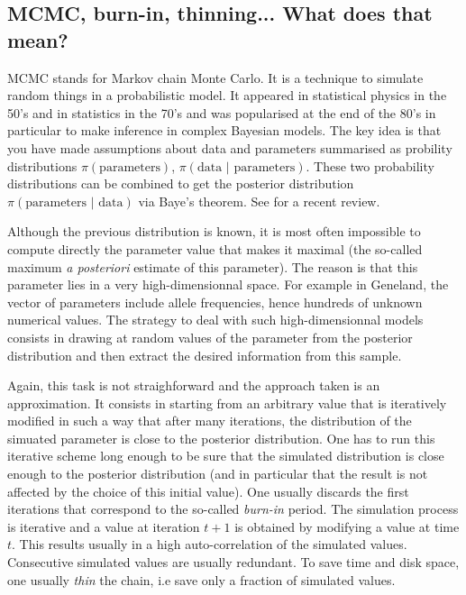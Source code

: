 \documentclass[a4paper,10pt]{article}
\begin{document}
\subsection[MCMC jargon]{MCMC, burn-in, thinning... What does that mean?}

MCMC stands for Markov chain Monte Carlo. It is a technique to simulate random things in a probabilistic model. 
It appeared in statistical physics 
in the 50's and in statistics in the 70's and was popularised at the end of the 80's in particular to make 
inference in complex Bayesian models. 
The key idea is that you have made assumptions about data and parameters summarised as probility distributions 
$\pi(\mbox{parameters})$,  $\pi(\mbox{data $|$ parameters})$. 
These two probability distributions can be combined to get the posterior distribution 
$\pi(\mbox{parameters $|$ data})$ via Baye's theorem. See \cite{Beaumont04} for a recent review. 


Although the previous distribution is known, it is most often impossible to compute directly the parameter value that 
makes it maximal (the so-called maximum {\em a posteriori} estimate of this parameter). The reason is that this parameter lies in a very high-dimensionnal 
space. For example in {\sc Geneland}, the vector of parameters  include allele frequencies, hence hundreds of unknown numerical values. 
The strategy to deal with such high-dimensionnal models consists in drawing at random values of the parameter from the posterior distribution 
and then extract the desired information from this sample. 

Again, this task is  not straighforward and the approach taken is an approximation. 
It consists in starting from an arbitrary value that is iteratively modified in such a way that after many iterations, 
the distribution of the 
simuated parameter is close to the posterior  distribution.  
One has to run this iterative scheme long enough to be sure that the simulated distribution is 
close enough to the posterior distribution (and in particular that the result is not  
affected by the choice of this initial value).
One usually discards the first iterations that correspond to the so-called {\em burn-in} period. 
The simulation process is iterative and a value at iteration $t+1$ is obtained by modifying a value at time $t$. This results usually in a 
high auto-correlation of the simulated values. Consecutive simulated values are usually redundant. To save time and disk space, 
one usually {\em thin} the chain, i.e save only  a fraction of simulated values. 
\end{document}

